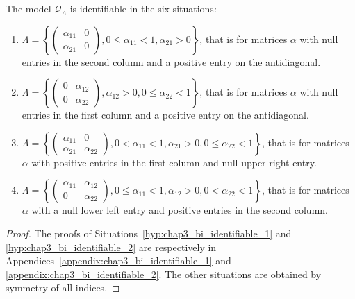       \begin{proposition}\label{prop:chap3_bi_identifiable}
      	The model $\mathcal Q_\Lambda$ is identifiable in the six situations:
        \begin{enumerate}
          \item \label{hyp:chap3_bi_identifiable_1} $\Lambda = \left\{ \begin{pmatrix} \alpha_{11} & 0 \\ \alpha_{21} & 0 \end{pmatrix}, 0 \le \alpha_{11} < 1, \alpha_{21} > 0 \right\}$, that is for matrices $\alpha$ with null entries in the second column and a positive entry on the antidiagonal.
          \item \label{hyp:chap3_bi_identifiable_1_bis} $\Lambda = \left\{ \begin{pmatrix} 0 & \alpha_{12} \\ 0 & \alpha_{22} \end{pmatrix}, \alpha_{12} > 0, 0 \le \alpha_{22} < 1 \right\}$, that is for matrices $\alpha$ with null entries in the first column and a positive entry on the antidiagonal.
          \item \label{hyp:chap3_bi_identifiable_2} $\Lambda = \left\{ \begin{pmatrix} \alpha_{11} & 0 \\ \alpha_{21} & \alpha_{22} \end{pmatrix}, 0 < \alpha_{11} < 1, \alpha_{21} > 0 , 0 \le \alpha_{22} < 1 \right\}$, that is for matrices $\alpha$ with positive entries in the first column and null upper right entry.
          \item \label{hyp:chap3_bi_identifiable_2_bis} $\Lambda = \left\{ \begin{pmatrix} \alpha_{11} & \alpha_{12} \\ 0 & \alpha_{22} \end{pmatrix}, 0 \le \alpha_{11} < 1, \alpha_{12} > 0, 0 < \alpha_{22} < 1 \right\}$, that is for matrices $\alpha$ with a null lower left entry and positive entries in the second column.
        \end{enumerate}
      \end{proposition}
      \begin{proof}
        The proofs of Situations~\ref{hyp:chap3_bi_identifiable_1} and \ref{hyp:chap3_bi_identifiable_2} are respectively in Appendices~\ref{appendix:chap3_bi_identifiable_1} and \ref{appendix:chap3_bi_identifiable_2}.
        The other situations are obtained by symmetry of all indices.
      \end{proof}
      
